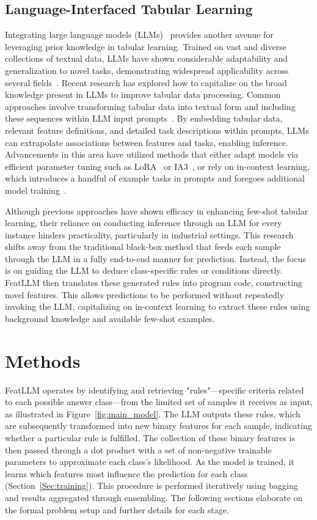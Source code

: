\subsection{Language-Interfaced Tabular Learning} Integrating large language models (LLMs)~\cite{anil2023palm,openai2023gpt4} provides another avenue for leveraging prior knowledge in tabular learning. Trained on vast and diverse collections of textual data, LLMs have shown considerable adaptability and generalization to novel tasks, demonstrating widespread applicability across several fields~\cite{brown2020language}. Recent research has explored how to capitalize on the broad knowledge present in LLMs to improve tabular data processing. Common approaches involve transforming tabular data into textual form and including these sequences within LLM input prompts~\cite{dinh2022lift,hegselmann2023tabllm,wang2023anypredict}. By embedding tabular data, relevant feature definitions, and detailed task descriptions within prompts, LLMs can extrapolate associations between features and tasks, enabling inference. Advancements in this area have utilized methods that either adapt models via efficient parameter tuning such as LoRA~\cite{hu2021lora} or IA3~\cite{liu2022few}, or rely on in-context learning, which introduces a handful of example tasks in prompts and foregoes additional model training~\cite{dinh2022lift,hegselmann2023tabllm,nam2023semi,slack2023tablet}.

Although previous approaches have shown efficacy in enhancing few-shot tabular learning, their reliance on conducting inference through an LLM for every instance hinders practicality, particularly in industrial settings. This research shifts away from the traditional black-box method that feeds each sample through the LLM in a fully end-to-end manner for prediction. Instead, the focus is on guiding the LLM to deduce class-specific rules or conditions directly. \textsf{FeatLLM} then translates these generated rules into program code, constructing novel features. This allows predictions to be performed without repeatedly invoking the LLM, capitalizing on in-context learning to extract these rules using background knowledge and available few-shot examples.

\section{Methods}
\textsf{FeatLLM} operates by identifying and retrieving "rules"—specific criteria related to each possible answer class—from the limited set of samples it receives as input, as illustrated in Figure~\ref{fig:main_model}. The LLM outputs these rules, which are subsequently transformed into new binary features for each sample, indicating whether a particular rule is fulfilled. The collection of these binary features is then passed through a dot product with a set of non-negative trainable parameters to approximate each class’s likelihood. As the model is trained, it learns which features most influence the prediction for each class (Section~\ref{Sec:training}). This procedure is performed iteratively using bagging and results aggregated through ensembling. The following sections elaborate on the formal problem setup and further details for each stage.

